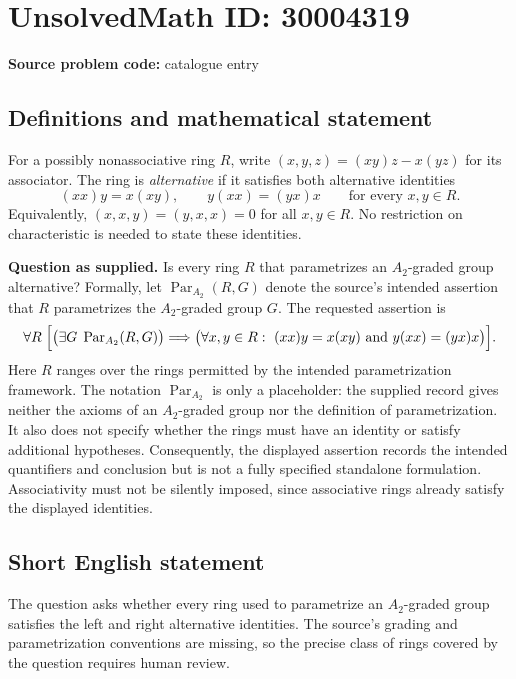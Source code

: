 \documentclass[11pt]{article}
\begin{document}
\section*{UnsolvedMath ID: 30004319}
\textbf{Source problem code:} catalogue entry
\subsection{Definitions and mathematical statement}
For a possibly nonassociative ring \(R\), write \((x,y,z)=(xy)z-x(yz)\) for its associator. The ring is \emph{alternative} if it satisfies both alternative identities
\[
(xx)y=x(xy),\qquad y(xx)=(yx)x
\qquad\text{for every }x,y\in R.
\]
Equivalently, \((x,x,y)=(y,x,x)=0\) for all \(x,y\in R\). No restriction on characteristic is needed to state these identities.

\textbf{Question as supplied.} Is every ring \(R\) that parametrizes an \(A_2\)-graded group alternative? Formally, let \(\operatorname{Par}_{A_2}(R,G)\) denote the source's intended assertion that \(R\) parametrizes the \(A_2\)-graded group \(G\). The requested assertion is
\[
\forall R\;\Bigl[
 \bigl(\exists G\;\operatorname{Par}_{A_2}(R,G)\bigr)
 \Longrightarrow
 \bigl(\forall x,y\in R:\ (xx)y=x(xy)\ \text{and}\ y(xx)=(yx)x\bigr)
\Bigr].
\]
Here \(R\) ranges over the rings permitted by the intended parametrization framework. The notation \(\operatorname{Par}_{A_2}\) is only a placeholder: the supplied record gives neither the axioms of an \(A_2\)-graded group nor the definition of parametrization. It also does not specify whether the rings must have an identity or satisfy additional hypotheses. Consequently, the displayed assertion records the intended quantifiers and conclusion but is not a fully specified standalone formulation. Associativity must not be silently imposed, since associative rings already satisfy the displayed identities.
\subsection{Short English statement}
The question asks whether every ring used to parametrize an \(A_2\)-graded group satisfies the left and right alternative identities. The source's grading and parametrization conventions are missing, so the precise class of rings covered by the question requires human review.
\end{document}
